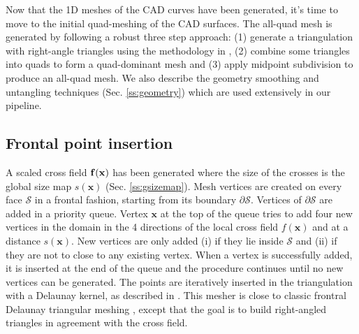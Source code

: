 \documentclass[AMA,STIX1COL]{WileyNJD-v2}
\newcommand{\vx}{\ensuremath{\mathbf{x}}}
\newcommand{\surface}{\ensuremath{\mathcal{S}}}
\newcommand\rsec[1]{Sec. \ref{#1}}
\begin{document}
{%



Now that the 1D meshes of the CAD curves have been generated, it's
time to move to the initial quad-meshing of the CAD surfaces.
The all-quad mesh is generated by following a robust three step
approach: (1) generate a triangulation with right-angle triangles
using the methodology in \cite{delquad}, (2) combine some 
triangles into quads to form a quad-dominant mesh and 
(3) apply midpoint subdivision to produce an all-quad mesh. 
We also describe the geometry smoothing and untangling techniques
(\rsec{ss:geometry}) which are used extensively in our pipeline.

\subsection{Frontal point insertion}
\label{ss:frontal}

A scaled cross field ${\bf f} (\vx)$ has been generated where the size
of the crosses is the global size map  $s(\vx)$ (\rsec{ss:gsizemap}).
Mesh vertices are created on every
face $\surface$ in a frontal fashion, starting from its boundary
$\partial \surface$. Vertices of $\partial \surface$ are
added in a priority queue. Vertex $\vx$ at the top of the queue
tries to add four new vertices in the domain in the 4 directions of
the local cross field $f(\vx)$ and at a distance $s(\vx)$. New vertices are only
added (i) if they lie inside $\surface$ and (ii) if they are not to close
to any existing vertex. When a vertex is successfully added, it is inserted
at the end of the queue and the procedure continues until no new vertices
can be generated. The points are iteratively inserted in the triangulation
with a Delaunay kernel, as described in \cite{delquad}. This mesher
is close to classic frontral Delaunay triangular meshing \cite{rebay1993},
except that the goal is to build right-angled triangles in agreement with
the cross field.

}
\end{document}
